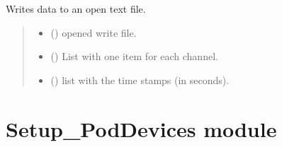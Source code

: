 \documentclass[letterpaper,10pt,english]{sphinxmanual}
\begin{document}
\begin{fulllineitems}
\begin{fulllineitems}
\label{\detokenize{Setup_8401HR:Setup_8401HR.Setup_8401HR._WriteDataToFile_TXT}}
\pysigstartsignatures
{}
\pysigstopsignatures
\sphinxAtStartPar
Writes data to an open text file.
\begin{quote}\begin{description}
\begin{itemize}
\item {} 
\sphinxAtStartPar
{} () \textendash{} opened write file.

\item {} 
\sphinxAtStartPar
{} (\sphinxstyleliteralemphasis{\sphinxupquote{{[}}}\sphinxstyleliteralemphasis{\sphinxupquote{{]}}}) \textendash{} List with one item for each channel.

\item {} 
\sphinxAtStartPar
{} () \textendash{} list with the time stamps (in seconds).

\end{itemize}

\end{description}\end{quote}

\end{fulllineitems}


\end{fulllineitems}


\sphinxstepscope


\section{Setup\_PodDevices module}
\label{\detokenize{Setup_PodDevices:module-Setup_PodDevices}}\label{\detokenize{Setup_PodDevices:setup-poddevices-module}}\label{\detokenize{Setup_PodDevices::doc}}
\end{document}
